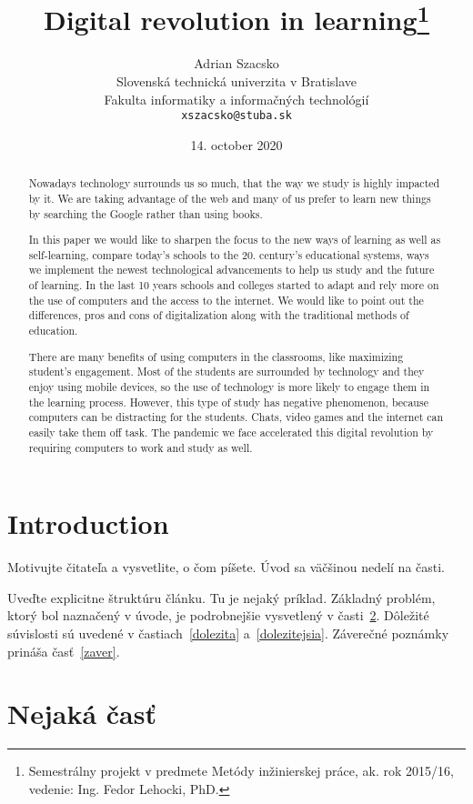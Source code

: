 \documentclass[10pt,twoside,english,a4paper]{article}
\title{Digital revolution in learning\thanks{Semestrálny projekt v predmete Metódy inžinierskej práce, ak. rok 2015/16, vedenie: Ing. Fedor Lehocki, PhD.}} %
\author{Adrian Szacsko\\[2pt]
	{\small Slovenská technická univerzita v Bratislave}\\
	{\small Fakulta informatiky a informačných technológií}\\
	{\small \texttt{xszacsko@stuba.sk}}
	}
\date{\small 14. october 2020} %
\begin{document}
\maketitle

\begin{abstract}
Nowadays technology surrounds us so much, that the way we study is highly impacted
by it. We are taking advantage of the web and many of us prefer to learn new things by
searching the Google rather than using books.

	In this paper we would like to sharpen the focus to the new ways of learning as well as
self-learning, compare today’s schools to the 20. century’s educational systems, ways we
implement the newest technological advancements to help us study and the future of
learning. In the last 10 years schools and colleges started to adapt and rely more on the use
of computers and the access to the internet. We would like to point out the differences, pros
and cons of digitalization along with the traditional methods of education. 

There are many benefits of using computers in the classrooms, like maximizing student’s engagement. Most
of the students are surrounded by technology and they enjoy using mobile devices, so the use
of technology is more likely to engage them in the learning process. However, this type of
study has negative phenomenon, because computers can be distracting for the students.
Chats, video games and the internet can easily take them off task. The pandemic we face
accelerated this digital revolution by requiring computers to work and study as well.
\end{abstract}



\section{Introduction}

Motivujte čitateľa a vysvetlite, o čom píšete. Úvod sa väčšinou nedelí na časti.

Uveďte explicitne štruktúru článku. Tu je nejaký príklad.
Základný problém, ktorý bol naznačený v úvode, je podrobnejšie vysvetlený v časti~\ref{nejaka}.
Dôležité súvislosti sú uvedené v častiach~\ref{dolezita} a~\ref{dolezitejsia}.
Záverečné poznámky prináša časť~\ref{zaver}.



\section{Nejaká časť} \label{nejaka}
\end{document}
